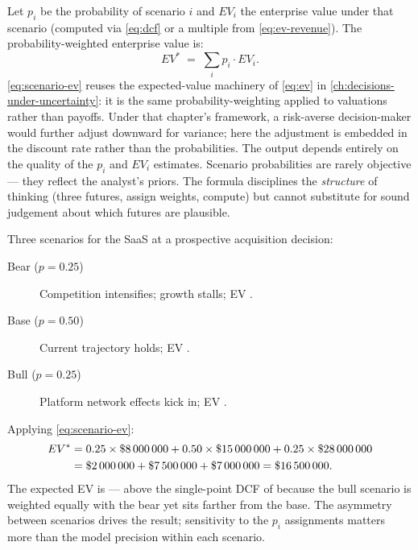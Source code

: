 Let \(p_i\) be the probability of scenario \(i\) and \(EV_i\) the enterprise value under
that scenario (computed via \cref{eq:dcf} or a multiple from \cref{eq:ev-revenue}). The
probability-weighted enterprise value is:
\begin{equation}\label{eq:scenario-ev}
  EV^* \;=\; \sum_{i} p_i \cdot EV_i.
\end{equation}
\cref{eq:scenario-ev} reuses the expected-value machinery of \cref{eq:ev} in
\cref{ch:decisions-under-uncertainty}: it is the same probability-weighting applied to
valuations rather than payoffs. Under that chapter's framework, a risk-averse
decision-maker would further adjust downward for variance; here the adjustment is embedded
in the discount rate rather than the probabilities. The output depends entirely on the
quality of the \(p_i\) and \(EV_i\) estimates. Scenario probabilities are rarely objective
--- they reflect the analyst's priors. The formula disciplines the \emph{structure} of
thinking (three futures, assign weights, compute) but cannot substitute for sound judgement
about which futures are plausible.

\begin{example}
Three scenarios for the SaaS at a prospective acquisition decision:

\begin{description}
  \item[Bear (\(p=0.25\))] Competition intensifies; growth stalls; EV .
  \item[Base (\(p=0.50\))] Current trajectory holds; EV .
  \item[Bull (\(p=0.25\))] Platform network effects kick in; EV .
\end{description}

Applying \cref{eq:scenario-ev}:
\[
  \begin{aligned}
    EV^* &= 0.25\times\$\num{8000000}
          + 0.50\times\$\num{15000000}
          + 0.25\times\$\num{28000000} \\
         &= \$\num{2000000}+\$\num{7500000}+\$\num{7000000}
          = \$\num{16500000}.
  \end{aligned}
\]
The expected EV is  --- above the single-point DCF of
 because the bull scenario is weighted equally with the bear yet sits
farther from the base.
The asymmetry between scenarios drives the result; sensitivity to the \(p_i\)
assignments matters more than the model precision within each scenario.
\end{example}

